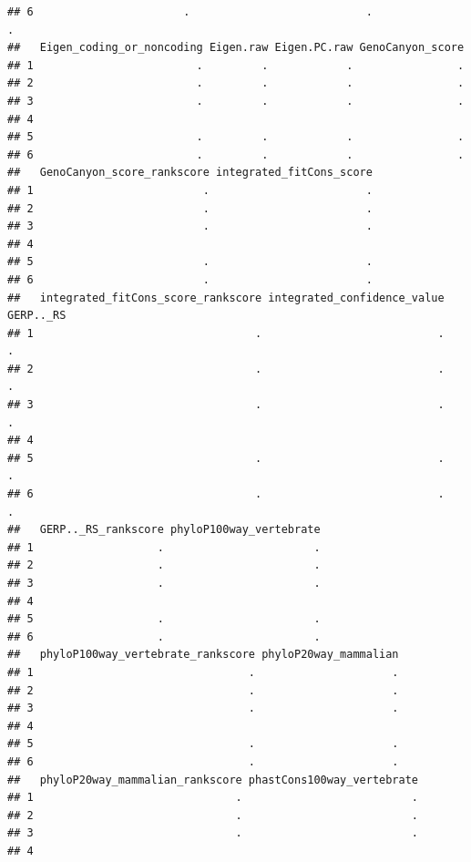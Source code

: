 \documentclass[
]{article}
\begin{document}
\begin{verbatim}
## 6                       .                           .                      .
##   Eigen_coding_or_noncoding Eigen.raw Eigen.PC.raw GenoCanyon_score
## 1                         .         .            .                .
## 2                         .         .            .                .
## 3                         .         .            .                .
## 4                                                                  
## 5                         .         .            .                .
## 6                         .         .            .                .
##   GenoCanyon_score_rankscore integrated_fitCons_score
## 1                          .                        .
## 2                          .                        .
## 3                          .                        .
## 4                                                    
## 5                          .                        .
## 6                          .                        .
##   integrated_fitCons_score_rankscore integrated_confidence_value GERP.._RS
## 1                                  .                           .         .
## 2                                  .                           .         .
## 3                                  .                           .         .
## 4                                                                         
## 5                                  .                           .         .
## 6                                  .                           .         .
##   GERP.._RS_rankscore phyloP100way_vertebrate
## 1                   .                       .
## 2                   .                       .
## 3                   .                       .
## 4                                            
## 5                   .                       .
## 6                   .                       .
##   phyloP100way_vertebrate_rankscore phyloP20way_mammalian
## 1                                 .                     .
## 2                                 .                     .
## 3                                 .                     .
## 4                                                        
## 5                                 .                     .
## 6                                 .                     .
##   phyloP20way_mammalian_rankscore phastCons100way_vertebrate
## 1                               .                          .
## 2                               .                          .
## 3                               .                          .
## 4                                                           

\end{verbatim}
\end{document}
